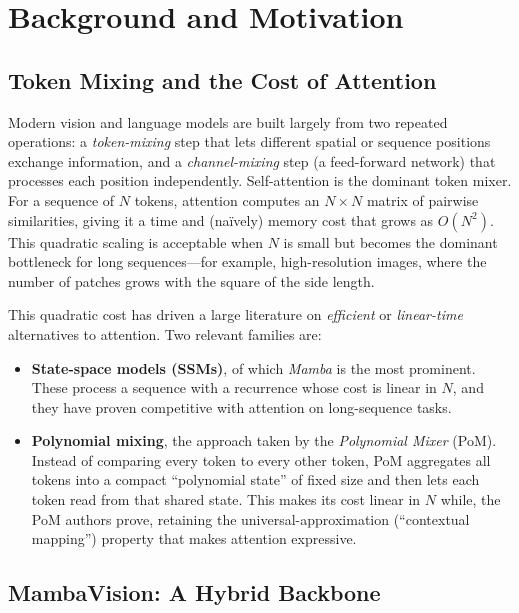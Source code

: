 \documentclass[11pt,a4paper]{article}
\begin{document}
\section{Background and Motivation}

\subsection{Token Mixing and the Cost of Attention}

Modern vision and language models are built largely from two repeated operations: a \emph{token-mixing} step that lets different spatial or sequence positions exchange information, and a \emph{channel-mixing} step (a feed-forward network) that processes each position independently. Self-attention is the dominant token mixer. For a sequence of $N$ tokens, attention computes an $N\times N$ matrix of pairwise similarities, giving it a time and (na\"ively) memory cost that grows as $O(N^2)$. This quadratic scaling is acceptable when $N$ is small but becomes the dominant bottleneck for long sequences---for example, high-resolution images, where the number of patches grows with the square of the side length.

This quadratic cost has driven a large literature on \emph{efficient} or \emph{linear-time} alternatives to attention. Two relevant families are:
\begin{itemize}[leftmargin=1.5em]
    \item \textbf{State-space models (SSMs)}, of which \emph{Mamba} is the most prominent. These process a sequence with a recurrence whose cost is linear in $N$, and they have proven competitive with attention on long-sequence tasks.
    \item \textbf{Polynomial mixing}, the approach taken by the \emph{Polynomial Mixer} (PoM). Instead of comparing every token to every other token, PoM aggregates all tokens into a compact ``polynomial state'' of fixed size and then lets each token read from that shared state. This makes its cost linear in $N$ while, the PoM authors prove, retaining the universal-approximation (``contextual mapping'') property that makes attention expressive.
\end{itemize}

\subsection{MambaVision: A Hybrid Backbone}
\end{document}

